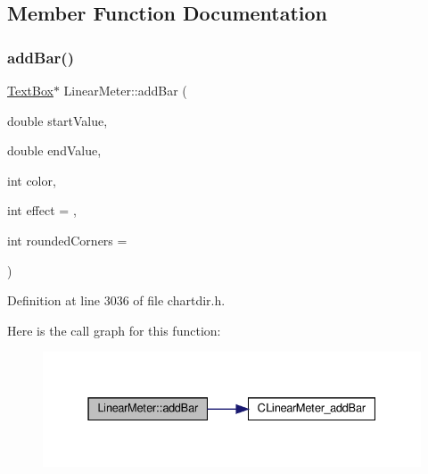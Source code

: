 \subsection{Member Function Documentation}
\mbox{\label{class_linear_meter_ae2cab5aaf926542c2856a4b8995bd051}} 
\subsubsection{\texorpdfstring{add\+Bar()}{addBar()}}
{\footnotesize\ttfamily \hyperlink{class_text_box}{Text\+Box}$\ast$ Linear\+Meter\+::add\+Bar (\begin{DoxyParamCaption}\item[{double}]{start\+Value,  }\item[{double}]{end\+Value,  }\item[{int}]{color,  }\item[{int}]{effect = {},  }\item[{int}]{rounded\+Corners = {} }\end{DoxyParamCaption})\hspace{0.3cm}{\ttfamily [inline]}}



Definition at line 3036 of file chartdir.\+h.

Here is the call graph for this function\+:
\nopagebreak
\begin{figure}[H]
\begin{center}
\leavevmode
\includegraphics[width=331pt]{class_linear_meter_ae2cab5aaf926542c2856a4b8995bd051_cgraph}
\end{center}
\end{figure}
\mbox{\label{class_linear_meter_adf04c08cb83e4f3d71ed056fcafff552}} 

